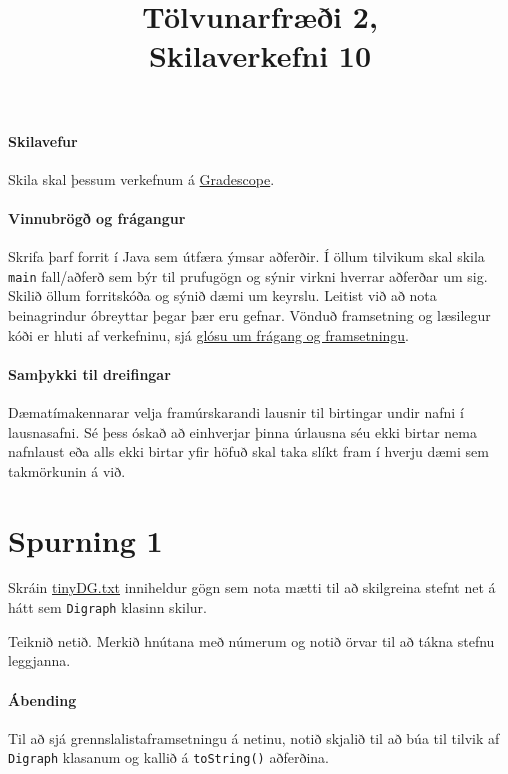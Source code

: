 \documentclass{article}
\title{Tölvunarfræði 2, \semester \\ Skilaverkefni 10}
\author{}
\begin{document}
\maketitle
{}

\paragraph{Skilavefur} Skila skal þessum verkefnum á \href{https://gradescope.com/courses/5640}{Gradescope}.

\paragraph{Vinnubrögð og frágangur} Skrifa þarf forrit í Java %
sem útfæra ýmsar aðferðir. Í öllum tilvikum skal skila \texttt{main} fall/aðferð sem býr til prufugögn og sýnir virkni hverrar aðferðar um sig. Skilið öllum forritskóða og sýnið dæmi um keyrslu. Leitist við að nota beinagrindur óbreyttar þegar þær eru gefnar. Vönduð framsetning og læsilegur kóði er hluti af verkefninu, sjá \href{https://piazza.com/class/ixkicfen49l111?cid=52}{glósu um frágang og framsetningu}.

\paragraph{Samþykki til dreifingar} Dæmatímakennarar velja framúrskarandi lausnir til birtingar undir nafni í lausnasafni. Sé þess óskað að einhverjar þinna úrlausna séu ekki birtar nema nafnlaust eða alls ekki birtar yfir höfuð skal taka slíkt fram í hverju dæmi sem takmörkunin á við.

\section{Spurning 1}
Skráin \href{https://github.com/Ernir/kennsluefni/tree/master/T2/Code/w10/tinyDG.txt}{tinyDG.txt} inniheldur gögn sem nota mætti til að skilgreina stefnt net á hátt sem \texttt{Digraph} klasinn skilur. 

Teiknið netið. Merkið hnútana með númerum og notið örvar til að tákna stefnu leggjanna.

\paragraph{Ábending} Til að sjá grennslalistaframsetningu á netinu, notið skjalið til að búa til tilvik af \texttt{Digraph} klasanum og kallið á \texttt{toString()} aðferðina.
\end{document}
